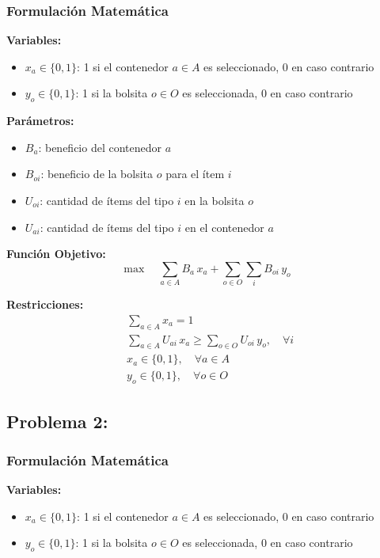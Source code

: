 \documentclass[a4paper,12pt]{article}
\begin{document}
\subsubsection{Formulación Matemática}

\textbf{Variables:}
\begin{itemize}
    \item $x_a \in \{0,1\}$: 1 si el contenedor $a \in A$ es seleccionado, 0 en caso contrario
    \item $y_o \in \{0,1\}$: 1 si la bolsita $o \in O$ es seleccionada, 0 en caso contrario
\end{itemize}

\textbf{Parámetros:}
\begin{itemize}
    \item $B_a$: beneficio del contenedor $a$
    \item $B_{oi}$: beneficio de la bolsita $o$ para el ítem $i$
    \item $U_{oi}$: cantidad de ítems del tipo $i$ en la bolsita $o$
    \item $U_{ai}$: cantidad de ítems del tipo $i$ en el contenedor $a$
\end{itemize}

\textbf{Función Objetivo:}
\begin{equation}
\max \quad \sum_{a \in A} B_a \, x_a + \sum_{o \in O} \sum_{i} B_{oi} \, y_o
\end{equation}

\textbf{Restricciones:}
\begin{align}
& \sum_{a \in A} x_a = 1 \\[6pt]
& \sum_{a \in A} U_{ai} \, x_a \geq \sum_{o \in O} U_{oi} \, y_o, \quad \forall i \\
& x_a \in \{0,1\}, \quad \forall a \in A \\
& y_o \in \{0,1\}, \quad \forall o \in O
\end{align}

\clearpage

\subsection{Problema 2:}
\label{sec:probl2}

\subsubsection{Formulación Matemática}
\textbf{Variables:}
\begin{itemize}
    \item $x_a \in \{0,1\}$: 1 si el contenedor $a \in A$ es seleccionado, 0 en caso contrario
    \item $y_o \in \{0,1\}$: 1 si la bolsita $o \in O$ es seleccionada, 0 en caso contrario
\end{itemize}
\end{document}
